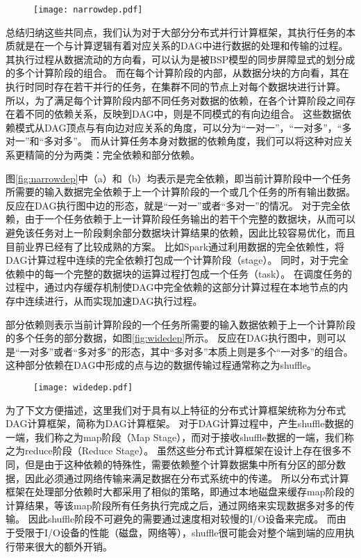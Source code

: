 \begin{figure}[!htp]
    \centering
    \texttt{[image: narrowdep.pdf]}
\end{figure}

总结归纳这些共同点，我们认为对于大部分分布式并行计算框架，其执行任务的本质就是在一个与计算逻辑有着对应关系的DAG中进行数据的处理和传输的过程。
其执行过程从数据流动的方向看，可以认为是被BSP模型的同步屏障显式的划分成的多个计算阶段的组合。
而在每个计算阶段的内部，从数据分块的方向看，其在执行时同时存在若干并行的任务，在集群不同的节点上对每个数据块进行计算。
所以，为了满足每个计算阶段内部不同任务对数据的依赖，在各个计算阶段之间存在着不同的依赖关系，反映到DAG中，则是不同模式的有向边组合。
这些数据依赖模式从DAG顶点与有向边对应关系的角度，可以分为“一对一”，“一对多”，“多对一”和“多对多”。
而从计算任务本身对数据的依赖角度，我们可以将这种对应关系更精简的分为两类：完全依赖和部分依赖。

图\ref{fig:narrowdep}中（a）和（b）均表示是完全依赖，即当前计算阶段中一个任务所需要的输入数据完全依赖于上一个计算阶段的一个或几个任务的所有输出数据。
反应在DAG执行图中边的形态，就是“一对一”或者“多对一”的情况。
对于完全依赖，由于一个任务依赖于上一计算阶段任务输出的若干个完整的数据块，从而可以避免该任务对上一阶段剩余部分数据块计算结果的依赖，因此比较容易优化，而且目前业界已经有了比较成熟的方案。
比如Spark通过利用数据的完全依赖性，将DAG计算过程中连续的完全依赖打包成一个计算阶段（stage）。
同时，对于完全依赖中的每一个完整的数据块的运算过程打包成一个任务（task）。
在调度任务的过程中，通过内存缓存机制使DAG中完全依赖的这部分计算过程在本地节点的内存中连续进行，从而实现加速DAG执行过程。

部分依赖则表示当前计算阶段的一个任务所需要的输入数据依赖于上一个计算阶段的多个任务的部分数据，如图\ref{fig:widedep}所示。
反应在DAG执行图中，则可以是“一对多”或者“多对多”的形态，其中“多对多”本质上则是多个“一对多”的组合。
这种部分依赖在DAG中形成的点与边的数据传输过程通常称之为shuffle。

\begin{figure}[!htp]
    \centering
    \texttt{[image: widedep.pdf]}
\end{figure}

为了下文方便描述，这里我们对于具有以上特征的分布式计算框架统称为分布式DAG计算框架，简称为DAG计算框架。
对于DAG计算过程中，产生shuffle数据的一端，我们称之为map阶段（Map Stage），而对于接收shuffle数据的一端，我们称之为reduce阶段（Reduce Stage）。
虽然这些分布式计算框架在设计上存在很多不同，但是由于这种依赖的特殊性，需要依赖整个计算数据集中所有分区的部分数据，因此必须通过网络传输来满足数据在分布式系统中的传递。
所以分布式计算框架在处理部分依赖时大都采用了相似的策略，即通过本地磁盘来缓存map阶段的计算结果，等该map阶段所有任务执行完成之后，通过网络来实现数据多对多的传输。
因此shuffle阶段不可避免的需要通过速度相对较慢的I/O设备来完成。
而由于受限于I/O设备的性能（磁盘，网络等），shuffle很可能会对整个端到端的应用执行带来很大的额外开销。

